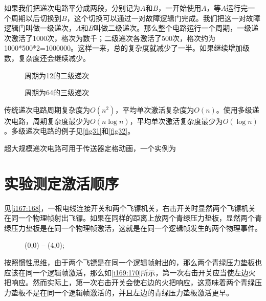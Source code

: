 如果我们把递次电路平分成两段，分别记为$A$和$B$，一开始使用$A$，等$A$运行完一个周期以后切换到$B$，这个切换可以通过一对故障逻辑门完成。我们把这一对故障逻辑门叫做一级递次，$A$和$B$叫做二级递次。那么整个电路运行一个周期，一级递次激活了1000次，格次为数千；二级递次各激活了500次，格次约为1000*500*2=1000000。这样一来，总的复杂度就减少了一半。如果继续增加级数，复杂度还会继续减少。

\begin{figure}[!ht]
  \centering
  \caption{周期为12的二级递次}\label{fig31}
\end{figure}
\begin{figure}[!ht]
  \centering
  \caption{周期为64的三级递次}\label{fig32}
\end{figure}

传统递次电路周期复杂度为$O(n^2)$，平均单次激活复杂度为$O(n)$。使用多级递次电路，周期复杂度最少为$O(n\log n)$，平均单次激活复杂度最少为$O(\log n)$。多级递次电路的例子见\autoref{fig31}和\autoref{fig32}。

超大规模递次电路可用于传送器定格动画，一个实例为

\section{实验测定激活顺序}

见\autoref{i167:168}，一根电线连接开关和两个飞镖机关，右击开关时显然两个飞镖机关在同一个物理帧射出飞镖。如果在同样的距离上放两个青绿压力垫板，显然两个青绿压力垫板是在同一个物理帧激活，这就是在同一个逻辑帧发生的两个物理事件。

\begin{figure}[!ht]
  \centering
  \begin{tikzpictureC}[TRsch]

     (0,0) -- (4,0);
  \end{tikzpictureC}
  \caption{}
  \label{i167:168}
\end{figure}

按照惯性思维，由于两个飞镖是在同一个逻辑帧射出的，那么两个青绿压力垫板也应该在同一个逻辑帧激活，那么如\autoref{i169:170}所示，第一次右击开关应当使左边火把响应。然而实际上，第一次右击开关会使右边的火把响应，这意味着两个青绿压力垫板不是在同一个逻辑帧激活的，并且左边的青绿压力垫板激活更早。

